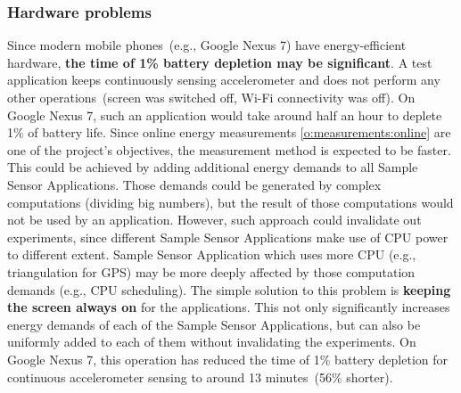 \subsubsection{Hardware problems}
\hspace{10pt} Since modern mobile phones\ (e.g., Google Nexus 7) have energy-efficient hardware, \textbf{the time of 1\% battery depletion may be significant}. A test application keeps continuously sensing accelerometer and does not perform any other operations\ (screen was switched off, Wi-Fi connectivity was off). On Google Nexus 7, such an application would take around half an hour to deplete 1\% of battery life. Since online energy measurements \ref{o:measurements:online} are one of the project's objectives, the measurement method is expected to be faster. This could be achieved by adding additional energy demands to all Sample Sensor Applications. Those demands could be generated by complex computations (dividing big numbers), but the result of those computations would not be used by an application. However, such approach could invalidate out experiments, since different Sample Sensor Applications make use of CPU power to different extent.  Sample Sensor Application which uses more CPU (e.g., triangulation for GPS) may be more deeply affected by those computation demands (e.g., CPU scheduling). The simple solution to this problem is \textbf{keeping the screen always on} for the applications.  This not only significantly increases energy demands of each of the Sample Sensor Applications, but can also be uniformly added to each of them without invalidating the experiments. On Google Nexus 7, this operation has reduced the time of 1\% battery depletion for continuous accelerometer sensing to around 13 minutes\ (56\% shorter). 

